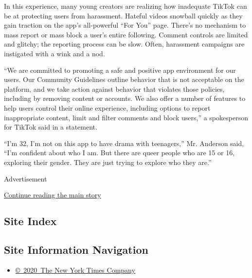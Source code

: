 In this experience, many young creators are realizing how inadequate
TikTok can be at protecting users from harassment. Hateful videos
snowball quickly as they gain traction on the app's all-powerful ``For
You'' page. There's no mechanism to mass report or mass block a user's
entire following. Comment controls are limited and glitchy; the
reporting process can be slow. Often, harassment campaigns are
instigated with a wink and a nod.

``We are committed to promoting a safe and positive app environment for
our users. Our Community Guidelines outline behavior that is not
acceptable on the platform, and we take action against behavior that
violates those policies, including by removing content or accounts. We
also offer a number of features to help users control their online
experience, including options to report inappropriate content, limit and
filter comments and block users,'' a spokesperson for TikTok said in a
statement.

``I'm 32, I'm not on this app to have drama with teenagers,'' Mr.
Anderson said, ``I'm confident about who I am. But there are queer
people who are 15 or 16, exploring their gender. They are just trying to
explore who they are.''

Advertisement

\protect\hyperlink{after-bottom}{Continue reading the main story}

\hypertarget{site-index}{%
\subsection{Site Index}\label{site-index}}

\hypertarget{site-information-navigation}{%
\subsection{Site Information
Navigation}\label{site-information-navigation}}

\begin{itemize}
\tightlist
\item
  \href{https://help.nytimes3xbfgragh.onion/hc/en-us/articles/115014792127-Copyright-notice}{©~2020~The
  New York Times Company}
\end{itemize}

